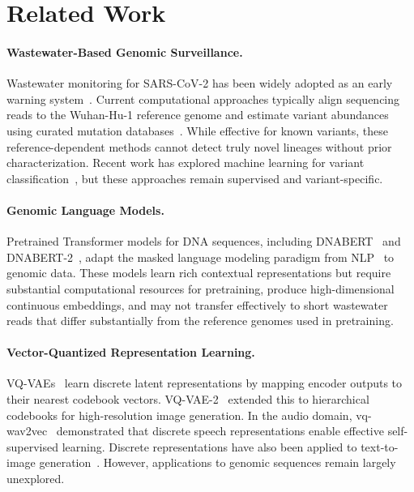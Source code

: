 \documentclass[pmlr]{jmlr}%
\begin{document}
\section{Related Work}
\label{sec:related}

\paragraph{Wastewater-Based Genomic Surveillance.}
Wastewater monitoring for SARS-CoV-2 has been widely adopted as an early warning system~\citep{bibby2021making, wu2020sars}. Current computational approaches typically align sequencing reads to the Wuhan-Hu-1 reference genome and estimate variant abundances using curated mutation databases~\citep{ karthikeyan2022wastewater}. While effective for known variants, these reference-dependent methods cannot detect truly novel lineages without prior characterization. Recent work has explored machine learning for variant classification~\citep{shrestha2024machine}, but these approaches remain supervised and variant-specific.

\paragraph{Genomic Language Models.}
Pretrained Transformer models for DNA sequences, including DNABERT~\citep{ji2021dnabert} and DNABERT-2~\citep{zhou2023dnabert}, adapt the masked language modeling paradigm from NLP~\citep{devlin2019bert} to genomic data. These models learn rich contextual representations but require substantial computational resources for pretraining, produce high-dimensional continuous embeddings, and may not transfer effectively to short wastewater reads that differ substantially from the reference genomes used in pretraining.

\paragraph{Vector-Quantized Representation Learning.}
VQ-VAEs~\citep{van2017neural} learn discrete latent representations by mapping encoder outputs to their nearest codebook vectors. VQ-VAE-2~\citep{razavi2019generating} extended this to hierarchical codebooks for high-resolution image generation. In the audio domain, vq-wav2vec~\citep{baevski2020vq} demonstrated that discrete speech representations enable effective self-supervised learning. Discrete representations have also been applied to text-to-image generation~\citep{ramesh2021zero}. However, applications to genomic sequences remain largely unexplored.
\end{document}
